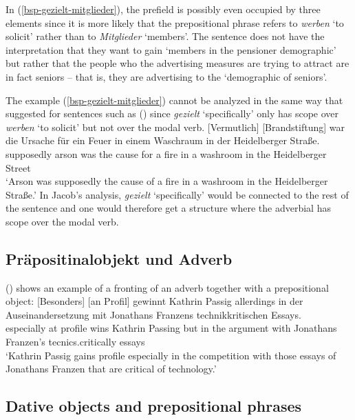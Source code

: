 In (\ref{bsp-gezielt-mitglieder}), the prefield is possibly even occupied by three elements since it is more likely that the
prepositional phrase refers to \emph{werben} `to solicit' rather than to \emph{Mitglieder} `members'. The sentence does not have the interpretation
that they want to gain `members in the pensioner demographic' but rather that the people who the advertising measures
are trying to attract are in fact seniors -- that is, they are advertising to the `demographic of seniors'.

The example (\ref{bsp-gezielt-mitglieder}) cannot be analyzed in the same way that \citet{Jacobs86a} suggested for
sentences such as () since \emph{gezielt} `specifically' only has scope over \emph{werben} `to solicit' but not over the modal verb.
\ea
\label{bsp-vermutlich}
\gll {}[Vermutlich] [Brandstiftung] war die Ursache für ein Feuer in einem Waschraum in der Heidelberger Straße.\footnotemark\\
	   \spacebr{}supposedly \spacebr{}arson was the cause for a fire in a washroom in the Heidelberger Street\\
\glt `Arson was supposedly the cause of a fire in a washroom in the Heidelberger Straße.'
\z
In Jacob's analysis, \emph{gezielt} `specifically' would be connected to the rest of the sentence
and one  would therefore get a structure where the adverbial has scope over the modal verb.


\subsection{Präpositinalobjekt und Adverb}

() shows an example of a fronting of an adverb together with a prepositional object:
\ea
\gll {}[Besonders] [an Profil] gewinnt Kathrin Passig allerdings in der Auseinandersetzung mit Jonathans Franzens technikkritischen Essays.\footnotemark\\
  \spacebr especially \spacebr at profile wins Kathrin Passing but in the argument with Jonathans Franzen's tecnics.critically essays\\ 
\glt `Kathrin Passig gains profile especially in the competition with those essays of Jonathans
Franzen that are critical of technology.' 
\z



\subsection{Dative objects and prepositional phrases}


